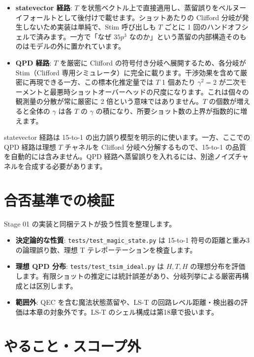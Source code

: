 \begin{itemize}
  \item \textbf{statevector 経路}: $T$ を状態ベクトル上で直接適用し、蒸留誤りをベルヌーイフォールトとして後付けで載せます。ショットあたりの Clifford 分岐が発生しないため実装は単純で、Stim 呼び出しも $T$ ごとに 1 回のハンドオフシェルで済みます。一方で「なぜ $35p^3$ なのか」という蒸留の内部構造そのものはモデルの外に置かれています。
  \item \textbf{QPD 経路}: $T$ を厳密に Clifford の符号付き分岐へ展開するため、各分岐が Stim（Clifford 専用シミュレータ）に完全に載ります。干渉効果を含めて厳密に再現できる一方、この標本化推定量では $T$ 1 個あたり $\gamma^2=2$ が二次モーメントと最悪時ショットオーバーヘッドの尺度になります。これは個々の観測量の分散が常に厳密に 2 倍という意味ではありません。$T$ の個数が増えると全体の $\gamma$ は各 $T$ の $\gamma$ の積になり、所要ショット数の上界が指数的に増えます\cite{temme2017qpd}。
\end{itemize}

statevector 経路は 15-to-1 の出力誤り模型を明示的に使います。一方、ここでの QPD 経路は理想 $T$ チャネルを Clifford 分岐へ分解するもので、15-to-1 の品質を自動的には含みません。QPD 経路へ蒸留誤りを入れるには、別途ノイズチャネルを合成する必要があります。

\section{合否基準での検証}\label{ch12:verification}

Stage 01 の実装と同梱テストが扱う性質を整理します。

\begin{itemize}
  \item \textbf{決定論的な性質}: \texttt{tests/test\_magic\_state.py} は 15-to-1 符号の距離と重み3の論理誤り数、理想 T テレポーテーションを検査します。
  \item \textbf{理想 QPD 分布}: \texttt{tests/test\_tsim\_ideal.py} は $H,T,H$ の理想分布を評価します。有限ショットの推定には統計誤差があり、分岐列挙による厳密再構成とは区別します。
  \item \textbf{範囲外}: QEC を含む魔法状態蒸留や、LS-T の回路レベル距離・検出器の評価は本章の対象外です。LS-T のシェル構成は第18章で扱います。
\end{itemize}

\section{やること・スコープ外}\label{sec:t_gate_scope}

